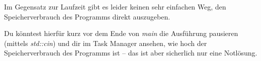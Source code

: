 \begin{enumerate}
Im Gegensatz zur Laufzeit gibt es leider keinen sehr einfachen Weg, den Speicherverbrauch des Programms direkt auszugeben.

Du könntest hierfür kurz vor dem Ende von \emph{main} die Ausführung pausieren (mittels \emph{std::cin}) und dir im Task Manager ansehen, wie hoch der Speicherverbrauch des Programms ist -- das ist aber sicherlich nur eine Notlösung.

\end{enumerate}


